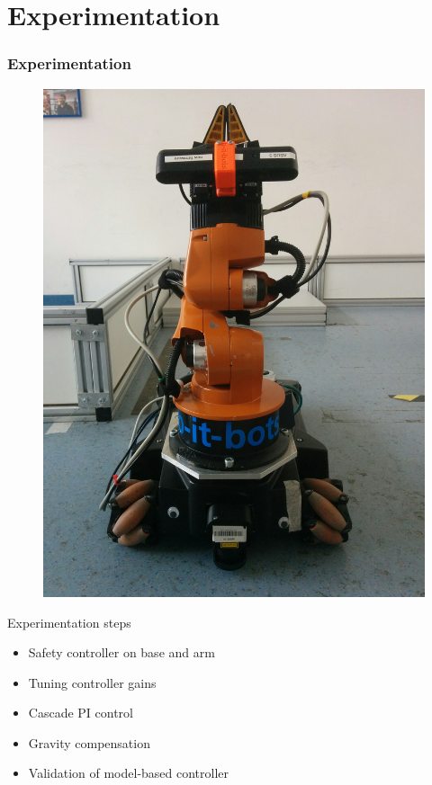 \documentclass{beamer}
\begin{document}
\section{Experimentation}
\begin{frame}
	\frametitle{Experimentation}
	\centering
	\begin{minipage}{0.4\textwidth}
	\begin{figure}[H]
		\includegraphics[width=0.7\linewidth]{images/youbot.jpg}
	\end{figure}
	\end{minipage} \hfill
	\begin{minipage}{0.55\textwidth}	
	Experimentation steps
	\begin{itemize}
	\item{Safety controller on base and arm}
	\item{Tuning controller gains}
	\item{Cascade PI control}
	\item{Gravity compensation}
	\item{Validation of model-based controller}
	\end{itemize}
	\end{minipage}
\end{frame}
\end{document}
